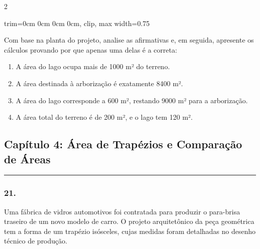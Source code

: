 \documentclass[twoside, 10pt, a4paper]{article}
\newlength{\espacoPosTitulo}\setlength{\espacoPosTitulo}{0.3cm}
\newlength{\espacoQuestao}\setlength{\espacoQuestao}{0.2cm}
\newlength{\espacoAlt}\setlength{\espacoAlt}{0.2cm}
\begin{document}
\begin{multicols*}{2}
\begin{center}
\begin{adjustbox}{trim=0cm 0cm 0cm 0cm, clip, max width=0.75\linewidth}
\end{adjustbox}
\end{center}

Com base na planta do projeto, analise as afirmativas e, em seguida, apresente os cálculos provando por que apenas uma delas é a correta:
\begin{enumerate}[label=\alph*), itemsep=\espacoAlt]
    \item A área do lago ocupa mais de 1000 m² do terreno.
    \item A área destinada à arborização é exatamente 8400 m².
    \item A área do lago corresponde a 600 m², restando 9000 m² para a arborização.
    \item A área total do terreno é de 200 m², e o lago tem 120 m².
\end{enumerate}
\par\vspace{\espacoQuestao}
\subsection*{Capítulo 4: Área de Trapézios e Comparação de Áreas}
\vspace{-0.2cm}\noindent\rule{\linewidth}{1.5pt} 
\par\vspace{\espacoPosTitulo}

\subsubsection*{21.} Uma fábrica de vidros automotivos foi contratada para produzir o para-brisa traseiro de um novo modelo de carro. O projeto arquitetônico da peça geométrica tem a forma de um trapézio isósceles, cujas medidas foram detalhadas no desenho técnico de produção.


\end{multicols*}
\end{document}
